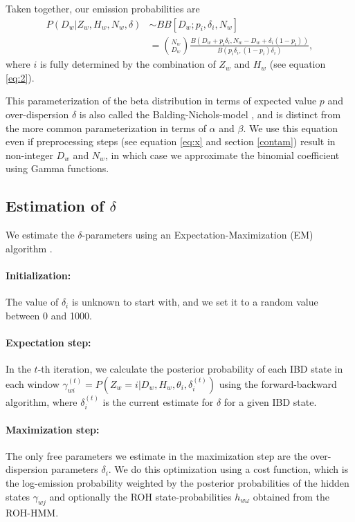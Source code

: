 \documentclass[12pt, letterpaper]{article}
\begin{document}
Taken together, our emission probabilities are 
\begin{align}\label{eq:3}
P(D_{w}|Z_w,H_w,N_w, \delta) &\sim BB[D_w; p_i, \delta_i, N_w] \nonumber\\
&= \binom{N_w}{D_w}\frac{B(D_w+p_i \delta_{i}, N_w-D_w+ \delta_{i}(1-p_{i}))}{ B(p_{i}\delta_{i}, (1-p_{i})\delta_{i})},
\end{align}
where $i$ is fully determined by the combination of $Z_w$ and $H_w$ (see equation \ref{eq:2}).

This parameterization of the beta distribution in terms of expected value $p$ and over-dispersion $\delta$ is also called the Balding-Nichols-model \cite{balding_method_nodate}, and is distinct from the more common parameterization in terms of $\alpha$ and $\beta$. We use this equation even if preprocessing steps (see equation \ref{eq:x} and section \ref{contam}) result in non-integer $D_w$ and $N_w$, in which case we approximate the binomial coefficient using Gamma functions.   

\subsection{Estimation of $\delta$}\label{delta}
We estimate the $\delta$-parameters using an Expectation-Maximization (EM) algorithm \cite{dempster_maximum_1977}.

\paragraph{Initialization:}
The value of $\delta_i$ is unknown to start with, and we set it to a random value between 0 and 1000.

\paragraph{Expectation step:}
In the $t$-th iteration, we calculate the posterior probability of each IBD state in each window $\gamma^{(t)}_{wi} = P(Z_w=i | D_w, H_w, \theta_i, \delta_i^{(t)})$ using the forward-backward algorithm, where $\delta_i^{(t)}$ is the current estimate for $\delta$ for a given IBD state.

\paragraph{Maximization step:}
The only free parameters we estimate in the maximization step are the over-dispersion parameters $\delta_i$. We do this optimization using a cost function, which is the log-emission probability weighted by the posterior probabilities of the hidden states $\gamma_{wj}$ and optionally the ROH state-probabilities $h_{w\omega}$ obtained from the ROH-HMM.
\end{document}
